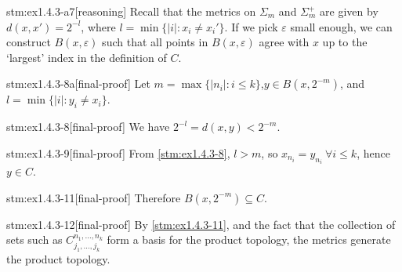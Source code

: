 \begin{stm}{stm:ex1.4.3-a7}[reasoning]
Recall that the metrics on $\Sigma_m$ and $\Sigma_m^+$ are given by $d(x,x') = 2^{-l}$, where $l = \min \{ |i| : x_i \ne x_i' \}$. If we pick $\varepsilon$ small enough, we can construct $B(x, \varepsilon)$ such that all points in $B(x, \varepsilon)$ agree with $x$ up to the ‘largest’ index in the definition of $C$.
\end{stm}

\begin{stm}{stm:ex1.4.3-8a}[final-proof]
Let $m = \max \{ |n_i| : i \leq k \}$,$y \in B(x, 2^{-m})$, and $l = \min \{ |i| : y_i \ne x_i \}$. 
\end{stm}

\begin{stm}{stm:ex1.4.3-8}[final-proof]
We have $2^{-l} = d(x,y) < 2^{-m}$.
\end{stm}

\begin{stm}{stm:ex1.4.3-9}[final-proof]
From \ref{stm:ex1.4.3-8}, $l > m$, so $x_{n_i} = y_{n_i} \ \forall i \leq k$, hence $y \in C$.
\end{stm}

\begin{stm}{stm:ex1.4.3-11}[final-proof]
Therefore $B(x, 2^{-m}) \subseteq C$.
\end{stm}

\begin{stm}{stm:ex1.4.3-12}[final-proof]
By \ref{stm:ex1.4.3-11}, and the fact that the collection of sets such as $C_{j_1,\ldots,j_k}^{n_1,\ldots,n_k}$ form a basis for the product topology, the metrics generate the product topology.
\end{stm}